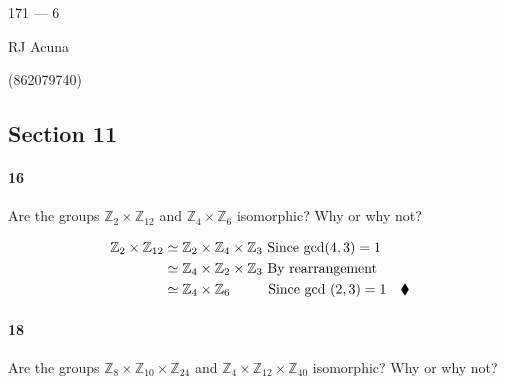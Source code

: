 \documentclass{article}
\newcommand\Z{\mathbb{Z}}
\begin{document}
\begin{center}
  171 --- 6

  RJ Acuna

  (862079740)
\end{center}\vspace{1.618em}




\subsection*{Section 11}

\paragraph{16} Are the groups $\Z_{2}\times\Z_{12}$ and
$\Z_4\times\Z_6$ isomorphic? Why or why not?

\begin{align*}
  \Z_{2}\times\Z_{12} &\simeq \Z_{2}\times
                        \Z_{4}\times\Z_{3} \text{ Since
                        gcd$(4,3) = 1$} \\
                      &\simeq \Z_{4}\times
                        \Z_2\times\Z_{3} \text{ By
                        rearrangement} \\
                      &\simeq \Z_4\times\Z_6\hspace{2.4em} \text{ Since
                        gcd $(2,3) = 1$}\quad \blacklozenge
\end{align*}

\paragraph{18} Are the groups $\Z_8\times \Z_{10} \times \Z_{24}$ and
$\Z_4\times \Z_{12} \times \Z_{40}$ isomorphic? Why or why not?
\end{document}
